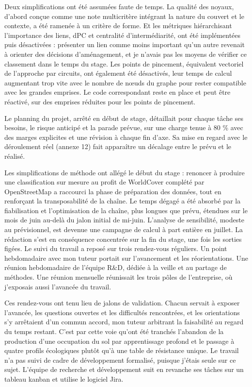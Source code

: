 \documentclass[a4paper,12pt]{report}
\begin{document}
Deux simplifications ont été assumées faute de temps. La qualité des noyaux, d'abord conçue comme une note multicritère intégrant la nature du couvert et le contexte, a été ramenée à un critère de forme. Et les métriques hiérarchisant l'importance des liens, dPC et centralité d'intermédiarité, ont été implémentées puis désactivées : présenter un lien comme moins important qu'un autre revenait à orienter des décisions d'aménagement, et je n'avais pas les moyens de vérifier ce classement dans le temps du stage. Les points de pincement, équivalent vectoriel de l'approche par circuits, ont également été désactivés, leur temps de calcul augmentant trop vite avec le nombre de nœuds du graphe pour rester compatible avec les grandes emprises. Le code correspondant reste en place et peut être réactivé, sur des emprises réduites pour les points de pincement.

Le planning du projet, arrêté en début de stage, détaillait pour chaque tâche ses besoins, le risque anticipé et la parade prévue, sur une charge tenue à 80 \% avec des marges explicites et une révision à chaque fin d'axe. Sa mise en regard avec le déroulement réel (annexe 12) fait apparaître un décalage entre le prévu et le réalisé.

Les simplifications de méthode ont allégé le début du stage : renoncer à produire une classification sur mesure au profit de WorldCover complété par OpenStreetMap a raccourci la phase de préparation des données, tout en renforçant la transposabilité de la chaîne. Le temps dégagé a été absorbé par la fiabilisation et l'optimisation de la chaîne, plus longues que prévu, étendues sur le mois de juin au-delà du jalon initial de mi-juin. L'analyse de sensibilité, modeste au prévisionnel, est devenue une campagne de calcul à part entière en juillet. La rédaction s'est en conséquence concentrée sur la fin du stage, une fois les sorties figées. Le suivi du travail a reposé sur trois rendez-vous réguliers. Un point hebdomadaire avec mon tuteur portait sur l'avancement et les réorientations. Une réunion hebdomadaire de l'équipe R\&D, dédiée à la veille et au partage de méthodes. Une réunion mensuelle réunissait les trois pôles de l'entreprise, où j'exposais aussi l'avancée du travail.

Ces rendez-vous ont tenu lieu de jalons de validation. Chacun servait à exposer l'avancée, les questions ouvertes et les difficultés rencontrées, et les orientations s'y arrêtaient d'un commun accord, mon tuteur arbitrant la faisabilité au regard du temps restant. C'est par cette voie qu'ont été tranchés l'abandon de la production d'une occupation du sol par apprentissage profond et le passage à quatre profils écologiques plutôt qu'à une table de résistance unique. Le travail n'a pas suivi de cadre de développement formalisé, puisque j'étais seule sur ce sujet. L'équipe de recherche et développement suit en revanche ses tâches sur un tableau kanban et utilise le logiciel Jira.
\end{document}
